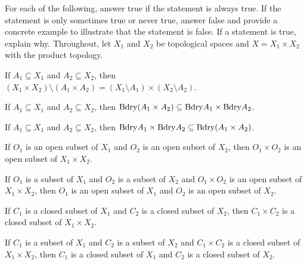 \item For each of the following, answer true if the statement is always true. If the statement is only sometimes true or never true, answer false and provide a concrete example to illustrate that the statement is false. If a statement is true, explain why. Throughout, let $X_1$ and $X_2$ be topological spaces and $X = X_1 \times X_2$ with the product topology. 
	\ba
	\item If $A_1 \subseteq X_1$ and $A_2 \subseteq X_2$, then $(X_1 \times X_2) \setminus (A_1 \times A_2) = (X_1 \setminus A_1) \times (X_2 \setminus A_2)$. 
	
	\item  If $A_1 \subseteq X_1$ and $A_2 \subseteq X_2$, then $\text{Bdry}(A_1 \times A_2) \subseteq \text{Bdry}{A_1} \times \text{Bdry}{A_2}$. 
	
	\item  If $A_1 \subseteq X_1$ and $A_2 \subseteq X_2$, then $\text{Bdry}{A_1} \times \text{Bdry}{A_2} \subseteq \text{Bdry}(A_1 \times A_2)$.
	
	\item If $O_1$ is an open subset of $X_1$ and $O_2$ is an open subset of $X_2$, then $O_1 \times O_2$ is an open subset of $X_1 \times X_2$.
	
	\item If $O_1$ is a subset of $X_1$ and $O_2$ is a subset of $X_2$ and $O_1 \times O_2$ is an open subset of $X_1 \times X_2$, then $O_1$ is an open subset of $X_1$ and $O_2$ is an open subset of  $X_2$.
	
	\item If $C_1$ is a closed subset of $X_1$ and $C_2$ is a closed subset of $X_2$, then $C_1 \times C_2$ is a closed subset of $X_1 \times X_2$.
	
	\item If $C_1$ is a subset of $X_1$ and $C_2$ is a subset of $X_2$ and $C_1 \times C_2$ is a closed subset of $X_1 \times X_2$, then $C_1$ is a closed subset of $X_1$ and $C_2$ is a closed subset of  $X_2$.
	
		
	\ea

